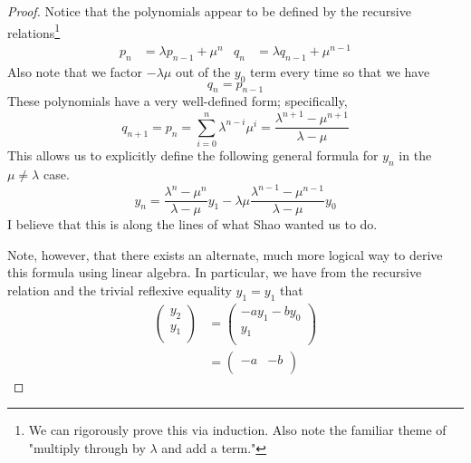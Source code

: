 \documentclass[../psets.tex]{subfiles}
\begin{document}
\begin{enumerate}
\begin{enumerate}
\begin{proof}
            Notice that the polynomials appear to be defined by the recursive relations\footnote{We can rigorously prove this via induction. Also note the familiar theme of "multiply through by $\lambda$ and add a term."}
            \begin{align*}
                p_n &= \lambda p_{n-1}+\mu^n&
                q_n &= \lambda q_{n-1}+\mu^{n-1}
            \end{align*}
            Also note that we factor $-\lambda\mu$ out of the $y_0$ term every time so that we have
            \begin{equation*}
                q_n = p_{n-1}
            \end{equation*}
            These polynomials have a very well-defined form; specifically,
            \begin{equation*}
                q_{n+1} = p_n
                = \sum_{i=0}^n\lambda^{n-i}\mu^i
                = \frac{\lambda^{n+1}-\mu^{n+1}}{\lambda-\mu}
            \end{equation*}
            This allows us to explicitly define the following general formula for $y_n$ in the $\mu\neq\lambda$ case.
            \begin{equation*}
                \boxed{y_n = \frac{\lambda^n-\mu^n}{\lambda-\mu}y_1-\lambda\mu\frac{\lambda^{n-1}-\mu^{n-1}}{\lambda-\mu}y_0}
            \end{equation*}
            I believe that this is along the lines of what Shao wanted us to do.\par
            Note, however, that there exists an alternate, much more logical way to derive this formula using linear algebra. In particular, we have from the recursive relation and the trivial reflexive equality $y_1=y_1$ that
            \begin{align*}
                \begin{pmatrix}
                    y_2\\
                    y_1\\
                \end{pmatrix}
                &=
                \begin{pmatrix}
                    -ay_1-by_0\\
                    y_1\\
                \end{pmatrix}\\
                &=
                \begin{pmatrix}
                    -a & -b\\

\end{pmatrix}
\end{align*}
\end{proof}
\end{enumerate}
\end{enumerate}
\end{document}
